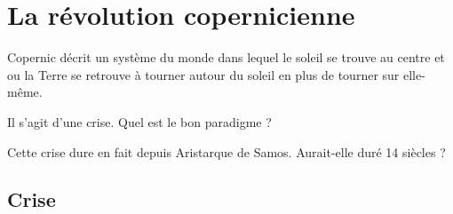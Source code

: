 

\section{La révolution copernicienne}

Copernic décrit un système du monde dans lequel le soleil se trouve au centre et ou la Terre se retrouve à tourner autour du soleil en plus de tourner sur elle-même.


Il s'agit d'une crise. Quel est le bon paradigme ?

Cette crise dure en fait depuis Aristarque de Samos. Aurait-elle duré 14 siècles ?


  \subsection{Crise}





